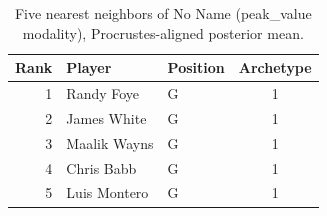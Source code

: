 \begin{table}[htbp]
  \centering\small
  \begin{tabular}{rllc}
    \toprule
    Rank & Player & Position & Archetype \\
    \midrule
    1 & Randy Foye & G & 1 \\
    2 & James White & G & 1 \\
    3 & Maalik Wayns & G & 1 \\
    4 & Chris Babb & G & 1 \\
    5 & Luis Montero & G & 1 \\
    \bottomrule
  \end{tabular}
  \caption{Five nearest neighbors of No Name (peak_value modality), Procrustes-aligned posterior mean.}
  \label{tab:No_Name_neighbors_peak_value}
\end{table}

